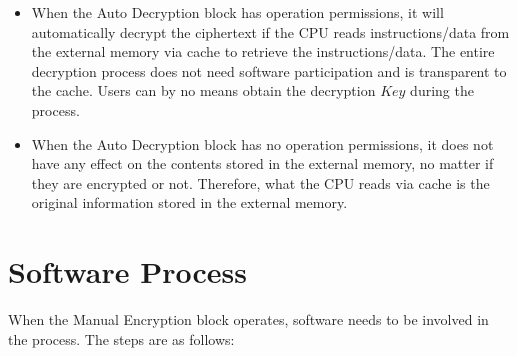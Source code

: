 \documentclass[main\_\_EN.tex]{subfiles}
\begin{document}
\begin{tiplisting}
\vspace{-2em}
\begin{itemize}

\item When the Auto Decryption block has operation permissions, it will automatically decrypt the ciphertext if the CPU reads instructions/data from the external memory via cache to retrieve the instructions/data. The entire decryption process does not need software participation and is transparent to the cache. Users can by no means obtain the decryption \begin{math}Key\end{math} during the process.

\item When the Auto Decryption block has no operation permissions, it does not have any effect on the contents stored in the external memory, no matter if they are encrypted or not. Therefore, what the CPU reads via cache is the original information stored in the external memory.

\end{itemize}
\end{tiplisting}


\section{ Software Process }

When the Manual Encryption block operates, software needs to be involved in the process. The steps are as follows:
\end{document}
